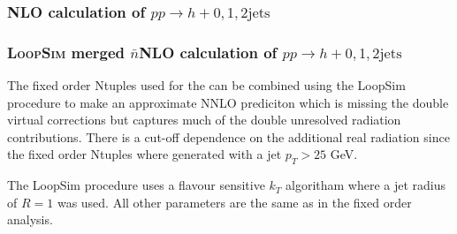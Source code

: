 \subsubsection{NLO calculation of $pp\to h+0,1,2\text{jets}$}
\label{sec:hjetscomp:tools:fo:hnj}

\subsubsection{\textsc{LoopSim} merged $\bar{n}$NLO calculation of $pp\to h+0,1,2\text{jets}$}
\label{sec:hjetscomp:tools:fo:hnj}

The fixed order Ntuples used for the can be combined using the LoopSim procedure to make
an approximate NNLO prediciton which is missing the double virtual corrections but captures
much of the double unresolved radiation contributions. There is a cut-off dependence on the
additional real radiation since the fixed order Ntuples where generated with a jet $p_T>25$ GeV.

The LoopSim procedure uses a flavour sensitive $k_T$ algoritham where a jet radius of $R=1$ was used.
All other parameters are the same as in the fixed order analysis.
